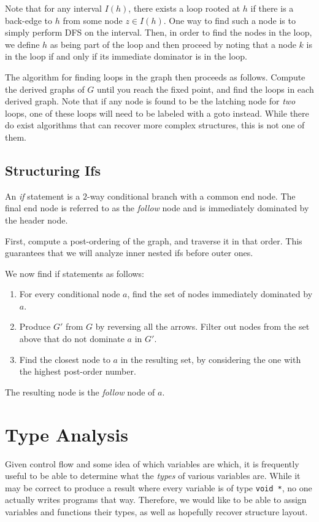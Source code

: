 \documentclass{article}
\begin{document}
Note that for any interval $I(h)$, there exists a loop rooted at $h$ if there is a back-edge
to $h$ from some node $z \in I(h)$. One way to find such a node is to simply perform DFS
on the interval. Then, in order to find the nodes in the loop, we define $h$ as being part of
the loop and then proceed by noting that a node $k$ is in the loop if and only if its immediate
dominator is in the loop.

The algorithm for finding loops in the graph then proceeds as follows.
Compute the derived graphs of $G$ until you reach the fixed point, and find the loops in each
derived graph. Note that if any node is found to be the latching node for {\em two} loops,
one of these loops will need to be labeled with a goto instead. While there do exist algorithms
that can recover more complex structures, this is not one of them.
\subsection{Structuring Ifs}
An {\em if} statement is a $2$-way conditional branch with a common end node. 
The final end node is referred to as the {\em follow} node and is immediately dominated
by the header node.

First, compute a post-ordering of the graph, and traverse it in that order. This guarantees
that we will analyze inner nested ifs before outer ones.

We now find if statements as follows:
\begin{enumerate}
\item For every conditional node $a$,
find the set of nodes immediately dominated by $a$.
\item Produce $G'$ from $G$ by
reversing all the arrows. Filter out nodes from the set above that do 
not dominate $a$ in $G'$.
\item Find the closest node to $a$ 
in the resulting set, by considering
the one with the highest post-order
number.
\end{enumerate}
The resulting node is the {\em follow} node of $a$.
\section{Type Analysis}
Given control flow and some idea of which variables are which, it is frequently useful to be
able to determine what the {\em types} of various variables are. While it may be correct
to produce a result where every variable is of type \verb+void *+, no one actually writes
programs that way. Therefore, we would like to be able to assign variables and functions their
types, as well as hopefully recover structure layout.
\end{document}
